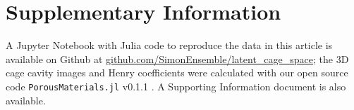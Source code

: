\documentclass[journal=jacsat,manuscript=article,layout=traditional]{achemso}
\begin{document}


\section{Supplementary Information} A Jupyter Notebook with Julia \cite{julia} code to reproduce the data in this article is available on Github at \url{github.com/SimonEnsemble/latent_cage_space}; the 3D cage cavity images and Henry coefficients were calculated with our open source code \texttt{PorousMaterials.jl} v0.1.1 \cite{PorousMaterialsJL}. A Supporting Information document is also available.


\end{document}
